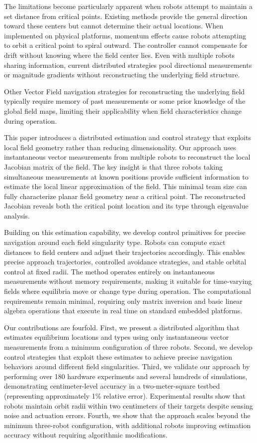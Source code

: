 \documentclass[lettersize,journal]{IEEEtran}
\begin{document}
The limitations become particularly apparent when robots attempt to maintain a set distance from critical points. Existing methods provide the general direction toward these centers but cannot determine their actual locations. When implemented on physical platforms, momentum effects cause robots attempting to orbit a critical point to spiral outward. The controller cannot compensate for drift without knowing where the field center lies. Even with multiple robots sharing information, current distributed strategies pool directional measurements or magnitude gradients without reconstructing the underlying field structure.

Other Vector Field navigation strategies for reconstructing the underlying field typically require memory of past measurements or some prior knowledge of the global field maps, limiting their applicability when field characteristics change during operation.

This paper introduces a distributed estimation and control strategy that exploits local field geometry rather than reducing dimensionality. Our approach uses instantaneous vector measurements from multiple robots to reconstruct the local Jacobian matrix of the field. The key insight is that three robots taking simultaneous measurements at known positions provide sufficient information to estimate the local linear approximation of the field. This minimal team size can fully characterize planar field geometry near a critical point. The reconstructed Jacobian reveals both the critical point location and its type through eigenvalue analysis.

Building on this estimation capability, we develop control primitives for precise navigation around each field singularity type. Robots can compute exact distances to field centers and adjust their trajectories accordingly. This enables precise approach trajectories, controlled avoidance strategies, and stable orbital control at fixed radii. The method operates entirely on instantaneous measurements without memory requirements, making it suitable for time-varying fields where equilibria move or change type during operation. The computational requirements remain minimal, requiring only matrix inversion and basic linear algebra operations that execute in real time on standard embedded platforms.

Our contributions are fourfold. First, we present a distributed algorithm that estimates equilibrium locations and types using only instantaneous vector measurements from a minimum configuration of three robots. Second, we develop control strategies that exploit these estimates to achieve precise navigation behaviors around different field singularities. Third, we validate our approach by performing over 180 hardware experiments and several hundreds of simulations, demonstrating centimeter-level accuracy in a two-meter-square testbed (representing approximately 1\% relative error). Experimental results show that robots maintain orbit radii within two centimeters of their targets despite sensing noise and actuation errors. Fourth, we show that the approach scales beyond the minimum three-robot configuration, with additional robots improving estimation accuracy without requiring algorithmic modifications. 
\end{document}
